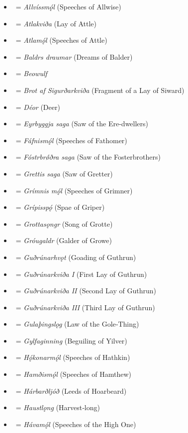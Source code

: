 \begin{itemize}%
	\item \Allvismal\ = \emph{Allvíssmǫ́l} (Speeches of Allwise)
	\item \Atlakvida\ = \emph{Atlakviða} (Lay of Attle)
	\item \Atlamal\ = \emph{Atlamǫ́l} (Speeches of Attle)
	\item \Baldrsdraumar\ = \emph{Baldrs draumar} (Dreams of Balder)
	\item \Beowulf\ = \emph{Beowulf}
	\item \Brot\ = \emph{Brot af Sigurðarkviða} (Fragment of a Lay of Siward)
	\item \Deor\ = \emph{Déor} (Deer)
	\item \EyrbyggjaSaga\ = \emph{Eyrbyggja saga} (Saw of the Ere-dwellers)
	\item \Fafnismal\ = \emph{Fáfnismǫ́l} (Speeches of Fathomer)
	\item \FostrbroedhraSaga\ = \emph{Fóstrbrǿðra saga} (Saw of the Fosterbrothers)
	\item \Grettissaga\ = \emph{Grettis saga} (Saw of Gretter)
	\item \Grimnismal\ = \emph{Grímnis mǫ́l} (Speeches of Grimner)
	\item \Gripisspa\ = \emph{Grípisspǫ́} (Spae of Griper)
	\item \Grottasongr\ = \emph{Grottasǫngr} (Song of Grotte)
	\item \Grougaldr\ = \emph{Gróugaldr} (Galder of Growe)
	\item \Gudrunarhvot\ = \emph{Guðrúnarhvǫt} (Goading of Guthrun)
	\item \GudrunOne\ = \emph{Guðrúnarkviða I} (First Lay of Guthrun)
	\item \GudrunTwo\ = \emph{Guðrúnarkviða II} (Second Lay of Guthrun)
	\item \GudrunThree\ = \emph{Guðrúnarkviða III} (Third Lay of Guthrun)
	\item \Gulatingslog\ = \emph{Gulaþingslǫg} (Law of the Gole‑Thing)
	\item \Gylfaginning\ = \emph{Gylfaginning} (Beguiling of Yilver)
	\item \Hakonarmal\ = \emph{Hǫ́konarmǫ́l} (Speeches of Hathkin)
	\item \Hamdismal\ = \emph{Hamðismǫ́l} (Speeches of Hamthew)
	\item \Harbardsljod\ = \emph{Hárbarðljóð} (Leeds of Hoarbeard)
	\item \Haustlong\ = \emph{Haustlǫng} (Harvest‑long)
	\item \Havamal\ = \emph{Hávamǫ́l} (Speeches of the High One)

\end{itemize}
